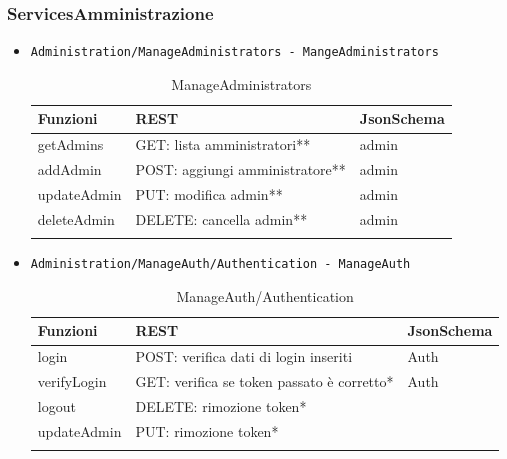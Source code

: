 \documentclass[../DefinizioneDiProdotto_v3.0.0.tex]{subfiles}
\begin{document}
\subsubsection{ServicesAmministrazione}
\begin{itemize}
	\item \texttt{Administration/ManageAdministrators - MangeAdministrators}
	      \begin{longtable}[c] { >{\centering\arraybackslash}p{3cm} >{\centering\arraybackslash}p{6cm} >{\centering\arraybackslash}p{3cm}}
	      	\toprule
	      	\centerline{\textbf{Funzioni}} & \centerline{\textbf{REST}}      & \centerline{\textbf{JsonSchema}} \\
	      	\midrule
	      	getAdmins                      & GET: lista amministratori**     & admin                            \\
	      	\addlinespace[0.3em]
	      	\midrule
	      	\addlinespace[0.3em]
	      	addAdmin                       & POST: aggiungi amministratore** & admin                            \\
	      	\addlinespace[0.3em]
	      	\midrule
	      	\addlinespace[0.3em]
	      	updateAdmin                    & PUT: modifica admin**           & admin                            \\
	      	\addlinespace[0.3em]
	      	\midrule
	      	\addlinespace[0.3em]
	      	deleteAdmin                    & DELETE: cancella admin**        & admin                            \\
	      	\bottomrule
	      	\caption{ManageAdministrators}
	      \end{longtable}

	\item \texttt{Administration/ManageAuth/Authentication - ManageAuth}
	      \begin{longtable}[c] { >{\centering\arraybackslash}p{3cm} >{\centering\arraybackslash}p{6cm} >{\centering\arraybackslash}p{3cm}}
	      	\toprule
	      	\centerline{\textbf{Funzioni}} & \centerline{\textbf{REST}}                  & \centerline{\textbf{JsonSchema}} \\
	      	\midrule
	      	login                          & POST: verifica dati di login inseriti       & Auth                             \\
	      	\addlinespace[0.3em]
	      	\midrule
	      	\addlinespace[0.3em]
	      	verifyLogin                    & GET: verifica se token passato è corretto* & Auth                             \\
	      	\addlinespace[0.3em]
	      	\midrule
	      	\addlinespace[0.3em]
	      	logout                         & DELETE: rimozione token*                    &                                  \\
	      	\addlinespace[0.3em]
	      	\midrule
	      	\addlinespace[0.3em]
	      	updateAdmin                    & PUT: rimozione token*                       &                                  \\
	      	\bottomrule
	      	\caption{ManageAuth/Authentication}
	      \end{longtable}


\end{itemize}
\end{document}
